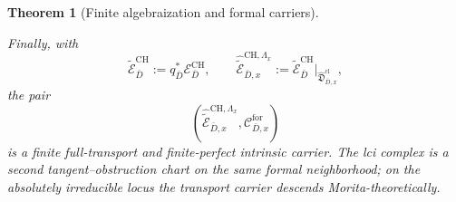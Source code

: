 \documentclass[11pt]{article}
\newtheorem{theorem}{Theorem}[section]
\theoremstyle{definition}
\begin{document}
\begin{theorem}[Finite algebraization and formal carriers]
\begin{enumerate}[label=\textnormal{(\roman*)}]
Finally, with
\[
\widetilde{\mathcal E}^{\mathrm{CH}}_{\bar D}
:=q_{\bar D}^{*}\mathcal E^{\mathrm{CH}}_{\bar D},
\qquad
\widehat{\widetilde{\mathcal E}}^{\mathrm{CH},\Lambda_x}_{\bar D,x}
:=\widetilde{\mathcal E}^{\mathrm{CH}}_{\bar D}
\big|_{\widehat{\mathfrak D}^{\mathrm{cl}}_{\bar D,x}},
\]
the pair
\begin{equation}\label{eq:pointwise-formal-carrier-pair}
\left(
\widehat{\widetilde{\mathcal E}}^{\mathrm{CH},\Lambda_x}_{\bar D,x},
\mathcal C^{\mathrm{for}}_{\bar D,x}
\right)
\end{equation}
is a finite full-transport and finite-perfect intrinsic carrier.  The lci complex is a second tangent--obstruction chart on the same formal neighborhood; on the absolutely irreducible locus the transport carrier descends Morita-theoretically.
\end{enumerate}
\end{theorem}
\end{document}
